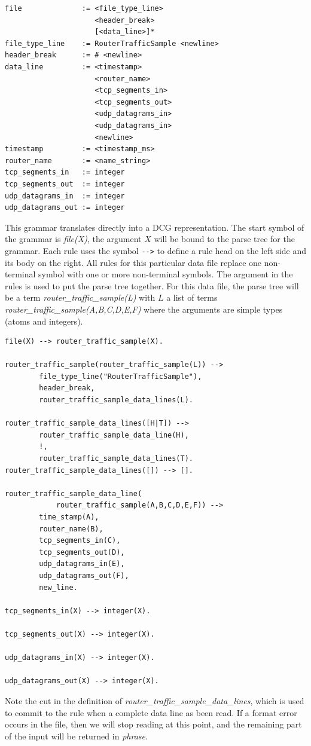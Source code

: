 \documentclass[a4paper,12pt]{report}
\begin{document}
\begin{verbatim}
file              := <file_type_line> 
                     <header_break>
                     [<data_line>]* 
file_type_line    := RouterTrafficSample <newline> 
header_break      := # <newline> 
data_line         := <timestamp> 
                     <router_name> 
                     <tcp_segments_in> 
                     <tcp_segments_out> 
                     <udp_datagrams_in> 
                     <udp_datagrams_in> 
                     <newline> 
timestamp         := <timestamp_ms> 
router_name       := <name_string>  
tcp_segments_in   := integer 
tcp_segments_out  := integer 
udp_datagrams_in  := integer 
udp_datagrams_out := integer 
\end{verbatim}

This grammar translates directly into a DCG representation. The start symbol of the grammar is {\it file(X)}, the argument $X$ will be bound to the parse tree for the grammar. Each rule uses the symbol \verb|-->| to define a rule head on the left side and its body on the right. All rules for this particular data file replace one non-terminal symbol with one or more non-terminal symbols. The argument in the rules is used to put the parse tree together. For this data file, the parse tree will be a term {\it router\_traffic\_sample(L)} with $L$ a list of terms {\it router\_traffic\_sample(A,B,C,D,E,F)} where the arguments are simple types (atoms and integers).

\begin{verbatim}
file(X) --> router_traffic_sample(X).

router_traffic_sample(router_traffic_sample(L)) --> 
        file_type_line("RouterTrafficSample"),
        header_break,
        router_traffic_sample_data_lines(L).

router_traffic_sample_data_lines([H|T]) --> 
        router_traffic_sample_data_line(H), 
        !,
        router_traffic_sample_data_lines(T).
router_traffic_sample_data_lines([]) --> [].

router_traffic_sample_data_line(
            router_traffic_sample(A,B,C,D,E,F)) --> 
        time_stamp(A),
        router_name(B),
        tcp_segments_in(C),
        tcp_segments_out(D),
        udp_datagrams_in(E),
        udp_datagrams_out(F),
        new_line.

tcp_segments_in(X) --> integer(X).

tcp_segments_out(X) --> integer(X).

udp_datagrams_in(X) --> integer(X).

udp_datagrams_out(X) --> integer(X).
\end{verbatim}
Note the cut in the definition of {\it router\_traffic\_sample\_data\_lines}, which is used to commit to the rule when a complete data line as been read. If a format error occurs in the file, then we will stop reading at this point, and the remaining part of the input will be returned in {\it phrase}.
\end{document}
